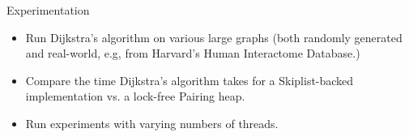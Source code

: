 \documentclass{beamer}
\begin{document}
\begin{frame}{Experimentation}
  \begin{itemize}
    \item Run Dijkstra's algorithm on various large graphs
      (both randomly generated and real-world, e.g, from Harvard's Human Interactome Database.)
    \item Compare the time Dijkstra's algorithm takes for a Skiplist-backed implementation vs. a lock-free Pairing heap.
    \item Run experiments with varying numbers of threads.
  \end{itemize}
\end{frame}
\end{document}
